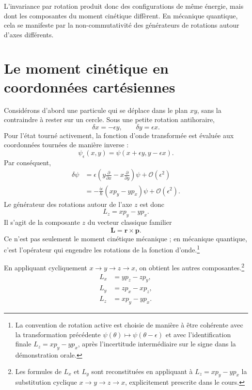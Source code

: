 L’invariance par rotation produit donc des configurations de même énergie, mais dont les composantes du moment cinétique diffèrent. En mécanique quantique, cela se manifeste par la non-commutativité des générateurs de rotations autour d’axes différents.

\section{Le moment cinétique en coordonnées cartésiennes}

Considérons d’abord une particule qui se déplace dans le plan \(xy\), sans la contraindre à rester sur un cercle. Sous une petite rotation antihoraire,
\begin{equation}
\delta x=-\epsilon y,
\qquad
\delta y=\epsilon x.
\end{equation}
Pour l’état tourné activement, la fonction d’onde transformée est évaluée aux coordonnées tournées de manière inverse :
\begin{equation}
\psi_\epsilon(x,y)
=\psi(x+\epsilon y,y-\epsilon x).
\end{equation}
Par conséquent,
\begin{align}
\delta\psi
&=\epsilon\left(
y\frac{\partial}{\partial x}
-x\frac{\partial}{\partial y}
\right)\psi
+\mathcal O(\epsilon^2)\\
&=-\frac{i\epsilon}{\hbar}
\left(xp_y-yp_x\right)\psi
+\mathcal O(\epsilon^2).
\end{align}
Le générateur des rotations autour de l’axe \(z\) est donc
\begin{equation}
L_z=xp_y-yp_x.
\end{equation}
Il s’agit de la composante \(z\) du vecteur classique familier
\begin{equation}
\mathbf L=\mathbf r\times\mathbf p.
\end{equation}
Ce n’est pas seulement le moment cinétique mécanique ; en mécanique quantique, c’est l’opérateur qui engendre les rotations de la fonction d’onde.\footnote{La convention de rotation active est choisie de manière à être cohérente avec la transformation précédente \(\psi(\theta)\mapsto\psi(\theta-\epsilon)\) et avec l’identification finale \(L_z=xp_y-yp_x\), après l’incertitude intermédiaire sur le signe dans la démonstration orale.}

En appliquant cycliquement \(x\to y\to z\to x\), on obtient les autres composantes.\footnote{Les formules de \(L_x\) et \(L_y\) sont reconstituées en appliquant à \(L_z=xp_y-yp_x\) la substitution cyclique \(x\to y\to z\to x\), explicitement prescrite dans le cours.}
\begin{align}
L_x&=yp_z-zp_y,\\
L_y&=zp_x-xp_z,\\
L_z&=xp_y-yp_x.
\end{align}

